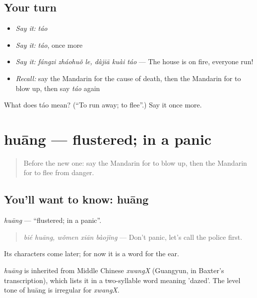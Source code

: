 \subsection*{Your turn}
\begin{itemize}
\raggedright
  \item \emph{Say it:} \emph{táo}
  \item \emph{Say it:} \emph{táo}, once more
  \item \emph{Say it:} \emph{fángzi zháohuǒ le, dàjiā kuài táo} — The house is on fire, everyone run!
  \item \emph{Recall:} say the Mandarin for the cause of death, then the Mandarin for to blow up, then say \emph{táo} again
\end{itemize}

\begin{tcolorbox}[breakable,colback=teal!4,colframe=teal!35!black,title={Before you move on}]
What does táo mean? (\textquotedblleft{}To run away; to flee\textquotedblright{}.) Say it once more.
\end{tcolorbox}
\section[huāng]{huāng — flustered; in a panic}

\label{lesson:ZH-C301-huang}



\begin{quote}
Before the new one: say the Mandarin for to blow up, then the Mandarin for to flee from danger.
\end{quote}

\subsection*{You'll want to know: huāng}
\emph{huāng} — \textquotedblleft{}flustered; in a panic\textquotedblright{}.

\begin{quote}
\emph{bié huāng, wǒmen xiān bàojǐng} — Don't panic, let's call the police first.
\end{quote}

Its characters come later; for now it is a word for the ear.

\begin{cousinweb}
\emph{huāng} is inherited from Middle Chinese \emph{xwangX} (Guangyun, in Baxter's transcription), which lists it in a two-syllable word meaning 'dazed'. The level tone of huāng is irregular for \emph{xwangX}.
\end{cousinweb}

